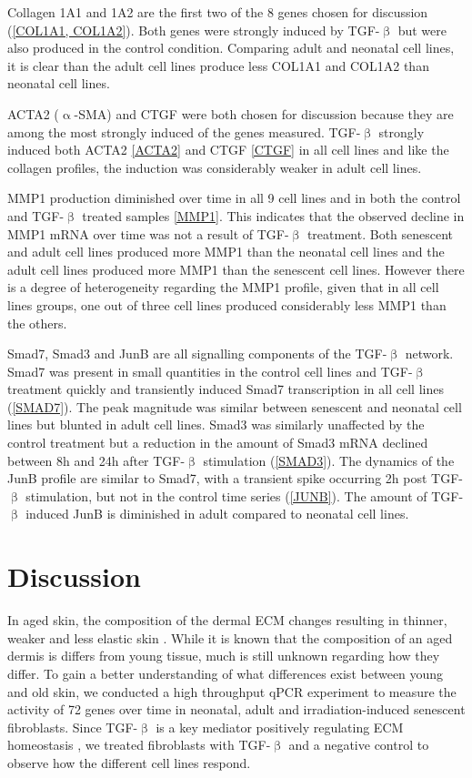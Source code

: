 \documentclass[alpha-refs]{wiley-article}
\newcommand{\tgf}{TGF-$\upbeta$}
\begin{document}
Collagen 1A1 and 1A2 are the first two of the 8 genes chosen for discussion (\cref{COL1A1, COL1A2}). Both genes were strongly induced by \tgf{} but were also produced in the control condition. Comparing adult and neonatal cell lines, it is clear than the adult cell lines produce less COL1A1 and COL1A2 than neonatal cell lines. 

ACTA2 ($\upalpha$-SMA) and CTGF were both chosen for discussion because they are among the most strongly induced of the genes measured. \tgf{} strongly induced both ACTA2 \cref{ACTA2} and CTGF \cref{CTGF} in all cell lines and like the collagen profiles, the induction was considerably weaker in adult cell lines. 

MMP1 production diminished over time in all 9 cell lines and in both the control and \tgf{} treated samples \cref{MMP1}. This indicates that the observed decline in MMP1 mRNA over time was not a result of \tgf{} treatment. Both senescent and adult cell lines produced more MMP1 than the neonatal cell lines and the adult cell lines produced more MMP1 than the senescent cell lines. However there is a degree of heterogeneity regarding the MMP1 profile, given that in all cell lines groups, one out of three cell lines produced considerably less MMP1 than the others. 

Smad7, Smad3 and JunB are all signalling components of the \tgf{} network. Smad7 was present in small quantities in the control cell lines and \tgf{} treatment quickly and transiently induced Smad7 transcription in all cell lines (\cref{SMAD7}). The peak magnitude was similar between senescent and neonatal cell lines but blunted in adult cell lines. Smad3 was similarly unaffected by the control treatment but a reduction in the amount of Smad3 mRNA declined between 8h and 24h after \tgf{} stimulation (\cref{SMAD3}). The dynamics of the JunB profile are similar to Smad7, with a transient spike occurring 2h post \tgf{} stimulation, but not in the control time series (\cref{JUNB}). The amount of \tgf{} induced JunB is diminished in adult compared to neonatal cell lines. 

\section{Discussion}
In aged skin, the composition of the dermal ECM changes resulting in thinner, weaker and less elastic skin \citep{Farage2009}. While it is known that the composition of an aged dermis is differs from young tissue, much is still unknown regarding how they differ. To gain a better understanding of what differences exist between young and old skin, we conducted a high throughput qPCR experiment to measure the activity of 72 genes over time in neonatal, adult and irradiation-induced senescent fibroblasts. Since \tgf{} is a key mediator positively regulating ECM homeostasis \citep{Hinz2015}, we treated fibroblasts with \tgf{} and a negative control to observe how the different cell lines respond. 
\end{document}
